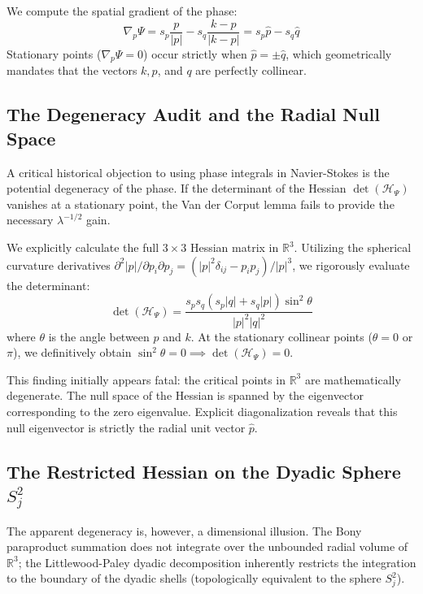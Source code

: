 \documentclass[12pt,a4paper]{article}
\theoremstyle{plain}
\theoremstyle{definition}
\theoremstyle{remark}
\begin{document}
We compute the spatial gradient of the phase:
\begin{equation}
    \nabla_p \Psi = s_p \frac{p}{|p|} - s_q \frac{k-p}{|k-p|} = s_p \hat{p} - s_q \hat{q}
\end{equation}
Stationary points ($\nabla_p \Psi = 0$) occur strictly when $\hat{p} = \pm \hat{q}$, which geometrically mandates that the vectors $k, p$, and $q$ are perfectly collinear.

\subsection{The Degeneracy Audit and the Radial Null Space}
A critical historical objection to using phase integrals in Navier-Stokes is the potential degeneracy of the phase. If the determinant of the Hessian $\det(\mathcal{H}_\Psi)$ vanishes at a stationary point, the Van der Corput lemma fails to provide the necessary $\lambda^{-1/2}$ gain. 

We explicitly calculate the full $3 \times 3$ Hessian matrix in $\mathbb{R}^3$. Utilizing the spherical curvature derivatives $\partial^2|p|/\partial p_i \partial p_j = (|p|^2 \delta_{ij} - p_i p_j)/|p|^3$, we rigorously evaluate the determinant:
\begin{equation}
    \det(\mathcal{H}_\Psi) = \frac{s_p s_q (s_p|q| + s_q|p|) \sin^2\theta}{|p|^2 |q|^2}
\end{equation}
where $\theta$ is the angle between $p$ and $k$. At the stationary collinear points ($\theta = 0$ or $\pi$), we definitively obtain $\sin^2\theta = 0 \implies \det(\mathcal{H}_\Psi) = 0$. 

This finding initially appears fatal: the critical points in $\mathbb{R}^3$ are mathematically degenerate. The null space of the Hessian is spanned by the eigenvector corresponding to the zero eigenvalue. Explicit diagonalization reveals that this null eigenvector is strictly the radial unit vector $\hat{p}$.

\subsection{The Restricted Hessian on the Dyadic Sphere $S^2_j$}
The apparent degeneracy is, however, a dimensional illusion. The Bony paraproduct summation does not integrate over the unbounded radial volume of $\mathbb{R}^3$; the Littlewood-Paley dyadic decomposition inherently restricts the integration to the boundary of the dyadic shells (topologically equivalent to the sphere $S^2_j$). 
\end{document}
